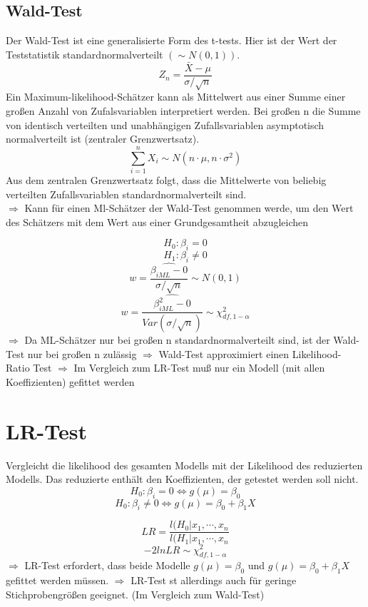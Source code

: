 \documentclass[10pt]{report}
\theoremstyle{definition}
\begin{document}
\subsection{Wald-Test}
Der Wald-Test ist eine generalisierte Form des t-tests. Hier ist der Wert der Teststatistik standardnormalverteilt $(\sim N(0,1))$.
\[Z_n = \frac{\bar{X} - \mu}{\sigma / \sqrt{n}} \]
Ein Maximum-likelihood-Schätzer kann als Mittelwert aus einer Summe einer großen Anzahl von Zufalsvariablen interpretiert werden.
Bei großen n die Summe von identisch verteilten und unabhängigen Zufallsvariablen asymptotisch normalverteilt ist (zentraler Grenzwertsatz).
\[\sum\limits_{i=1}^{n} X_i \sim N(n \cdot \mu, n \cdot \sigma^{2}) \]
Aus dem zentralen Grenzwertsatz folgt, dass die Mittelwerte von beliebig verteilten Zufallsvariablen standardnormalverteilt sind. \\
$\Rightarrow$ Kann für einen Ml-Schätzer der Wald-Test genommen werde, um den Wert des Schätzers mit dem Wert aus einer Grundgesamtheit abzugleichen

\[ H_0: \beta_i = 0 \]
\[ H_1: \beta_i \neq 0 \]
\[ w = \frac{\hat{\beta_{iML}-0}}{\sigma / \sqrt{n}} \sim N(0,1) \]
\[ w = \frac{\hat{\beta_{iML}^{2}-0}}{Var(\sigma / \sqrt{n})} \sim \chi_{df,1-\alpha}^{2} \]
$\Rightarrow$ Da ML-Schätzer nur bei großen n standardnormalverteilt sind, ist der Wald-Test nur bei großen n zulässig
$\Rightarrow$ Wald-Test approximiert einen Likelihood-Ratio Test
$\Rightarrow$ Im Vergleich zum LR-Test muß nur ein Modell (mit allen Koeffizienten) gefittet werden
\section{LR-Test}
Vergleicht die likelihood des gesamten Modells mit der Likelihood des reduzierten Modells. Das reduzierte enthält den Koeffizienten, der getestet werden soll nicht.
\[ H_0 : \beta_i = 0 \Leftrightarrow g(\mu) = \beta_0 \]
\[ H_0 : \beta_i \neq 0 \Leftrightarrow g(\mu) = \beta_0 + \beta_1 X \]

\[LR = \frac{l(H_0 | x_1,\cdots,x_n}{l(H_1 | x_1,\cdots,x_n}\]
\[ -2 ln LR \sim  \chi_{df,1-\alpha}^{2} \]
$\Rightarrow$ LR-Test erfordert, dass beide Modelle $g(\mu)=\beta_0$ und $g(\mu)=\beta_0 + \beta_1 X$ gefittet werden müssen.
$\Rightarrow$ LR-Test st allerdings auch für geringe Stichprobengrößen geeignet. (Im Vergleich zum Wald-Test)
\end{document}
